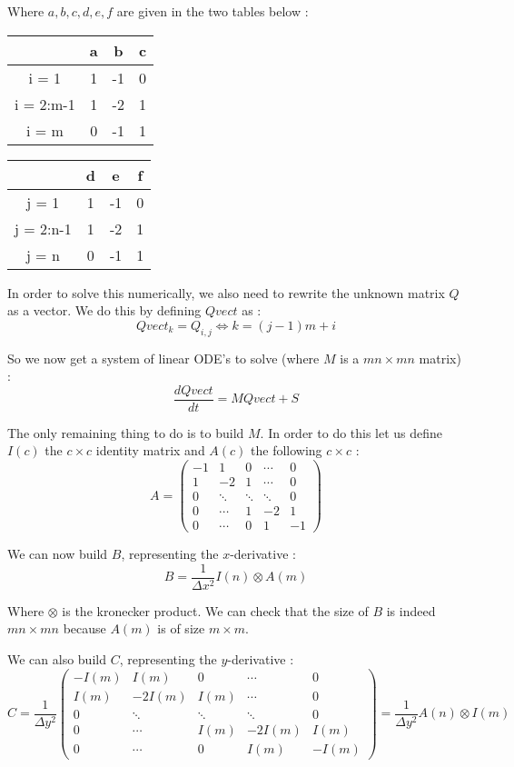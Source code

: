 Where $a,b,c,d,e,f$ are given in the two tables below : 
\begin{center}
\begin{tabular}{|c|c|c|c|}
\hline 
 & a & b & c \\ 
\hline 
i = 1 & 1 & -1 & 0 \\ 
\hline 
i = 2:m-1 & 1 & -2 & 1 \\ 
\hline 
i = m & 0 & -1 & 1 \\ 
\hline 
\end{tabular} 
\begin{tabular}{|c|c|c|c|}
\hline 
 & d & e & f \\ 
\hline 
j = 1 & 1 & -1 & 0 \\ 
\hline 
j = 2:n-1 & 1 & -2 & 1 \\ 
\hline 
j = n & 0 & -1 & 1 \\ 
\hline 
\end{tabular} 
\end{center}

In order to solve this numerically, we also need to rewrite the unknown matrix $Q$ as a vector. We do this by defining $Qvect$ as :
$$Qvect_k = Q_{i,j}   \iff k = (j-1)m + i$$

So we now get a system of linear ODE's to solve (where $M$ is a $mn \times mn$ matrix) : 
$$\frac{dQvect}{dt} = MQvect + S$$

The only remaining thing to do is to build $M$. In order to do this let us define $I(c)$ the $c\times c $ identity matrix and $A(c)$ the following $c\times c $ : 
$$A = \left(\begin{array}{ccccc}
-1 & 1 & 0 & \cdots & 0 \\ 
1 & -2 & 1 & \cdots & 0 \\ 
0& \ddots & \ddots & \ddots & 0 \\ 
0 & \cdots & 1 & -2 & 1 \\
0 & \cdots & 0 & 1 & -1
\end{array}\right) $$

We can now build $B$, representing the $x$-derivative : 
$$B = \frac{1}{\Delta x^2}I(n)\otimes A(m)$$

Where $\otimes$ is the kronecker product. We can check that the size of $B$ is indeed $mn \times mn$ because $A(m)$ is of size $m \times m$.

We can also build $C$, representing the $y$-derivative : 
$$C = \frac{1}{\Delta y^2}\left(\begin{array}{ccccc}
-I(m) & I(m) & 0 & \cdots & 0 \\ 
I(m) & -2I(m) & I(m) & \cdots & 0 \\ 
0& \ddots & \ddots & \ddots & 0 \\ 
0 & \cdots & I(m) & -2I(m) & I(m) \\
0 & \cdots & 0 & I(m) & -I(m)
\end{array}\right) =\frac{1}{\Delta y^2} A(n)\otimes I(m)$$

